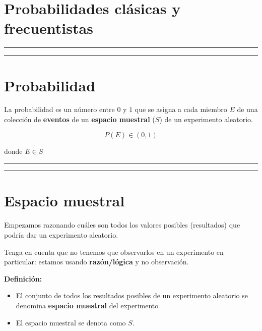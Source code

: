 \documentclass[
]{book}
\begin{document}
\hypertarget{probabilidades-cluxe1sicas-y-frecuentistas}{%
\section{Probabilidades clásicas y frecuentistas}\label{probabilidades-cluxe1sicas-y-frecuentistas}}

\begin{center}\rule{0.5\linewidth}{0.5pt}\end{center}

\begin{center}\rule{0.5\linewidth}{0.5pt}\end{center}

\hypertarget{probabilidad-2}{%
\section{Probabilidad}\label{probabilidad-2}}

La probabilidad es un número entre \(0\) y \(1\) que se asigna a cada miembro \(E\) de una colección de \textbf{eventos} de un \textbf{espacio muestral} (\(S\)) de un experimento aleatorio.

\[P(E) \in (0,1)\]

donde \(E \in S\)

\begin{center}\rule{0.5\linewidth}{0.5pt}\end{center}

\begin{center}\rule{0.5\linewidth}{0.5pt}\end{center}

\hypertarget{espacio-muestral}{%
\section{Espacio muestral}\label{espacio-muestral}}

Empezamos razonando cuáles son todos los valores posibles (resultados) que podría dar un experimento aleatorio.

Tenga en cuenta que no tenemos que observarlos en un experimento en particular: estamos usando \textbf{razón/lógica} y no observación.

\textbf{Definición:}

\begin{itemize}
\item
  El conjunto de todos los resultados posibles de un experimento aleatorio se denomina \textbf{espacio muestral}
  del experimento
\item
  El espacio muestral se denota como \(S\).
\end{itemize}
\end{document}
